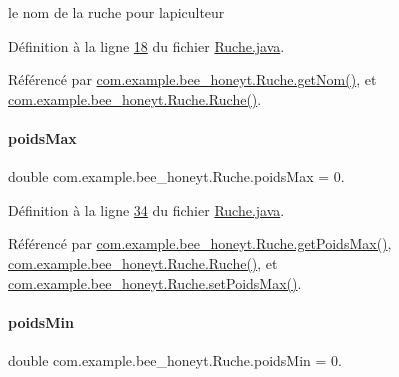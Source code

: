le nom de la ruche pour l\textquotesingle{}apiculteur 



Définition à la ligne \hyperlink{_ruche_8java_source_l00018}{18} du fichier \hyperlink{_ruche_8java_source}{Ruche.\+java}.



Référencé par \hyperlink{_ruche_8java_source_l00089}{com.\+example.\+bee\+\_\+honeyt.\+Ruche.\+get\+Nom()}, et \hyperlink{_ruche_8java_source_l00038}{com.\+example.\+bee\+\_\+honeyt.\+Ruche.\+Ruche()}.

\mbox{\label{classcom_1_1example_1_1bee__honeyt_1_1_ruche_a5901bf432f6d2de0e5facb8952277cbc}} 
\paragraph{\texorpdfstring{poids\+Max}{poidsMax}}
{\footnotesize\ttfamily double com.\+example.\+bee\+\_\+honeyt.\+Ruche.\+poids\+Max = 0.\hspace{0.3cm}{\ttfamily [private]}}



Définition à la ligne \hyperlink{_ruche_8java_source_l00034}{34} du fichier \hyperlink{_ruche_8java_source}{Ruche.\+java}.



Référencé par \hyperlink{_ruche_8java_source_l00219}{com.\+example.\+bee\+\_\+honeyt.\+Ruche.\+get\+Poids\+Max()}, \hyperlink{_ruche_8java_source_l00044}{com.\+example.\+bee\+\_\+honeyt.\+Ruche.\+Ruche()}, et \hyperlink{_ruche_8java_source_l00224}{com.\+example.\+bee\+\_\+honeyt.\+Ruche.\+set\+Poids\+Max()}.

\mbox{\label{classcom_1_1example_1_1bee__honeyt_1_1_ruche_a3408f099f2fab8700353e6e266fe8221}} 
\paragraph{\texorpdfstring{poids\+Min}{poidsMin}}
{\footnotesize\ttfamily double com.\+example.\+bee\+\_\+honeyt.\+Ruche.\+poids\+Min = 0.\hspace{0.3cm}{\ttfamily [private]}}



